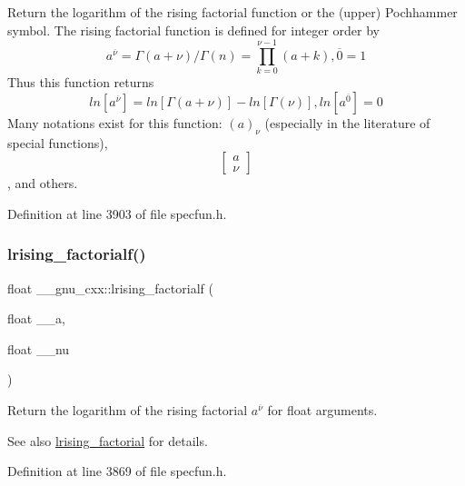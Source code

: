 Return the logarithm of the rising factorial function or the (upper) Pochhammer symbol. The rising factorial function is defined for integer order by \[ a^{\overline{\nu}} = \Gamma(a + \nu) / \Gamma(n) = \prod_{k=0}^{\nu-1} (a + k), \overline{0} = 1 \] Thus this function returns \[ ln[a^{\overline{\nu}}] = ln[\Gamma(a + \nu)] - ln[\Gamma(\nu)], ln[a^{\overline{0}}] = 0 \] Many notations exist for this function\+: $ (a)_\nu $ (especially in the literature of special functions), \[ \left[ \begin{array}{c} a \\ \nu \end{array} \right] \], and others. 



Definition at line 3903 of file specfun.\+h.

\mbox{\label{group__gnu__math__spec__func_ga68c64f4e44d03b5b3f75f90dbe2e0819}} 
\subsubsection{\texorpdfstring{lrising\+\_\+factorialf()}{lrising\_factorialf()}}
{\footnotesize\ttfamily float \+\_\+\+\_\+gnu\+\_\+cxx\+::lrising\+\_\+factorialf (\begin{DoxyParamCaption}\item[{float}]{\+\_\+\+\_\+a,  }\item[{float}]{\+\_\+\+\_\+nu }\end{DoxyParamCaption})\hspace{0.3cm}{\ttfamily [inline]}}

Return the logarithm of the rising factorial $ a^{\overline{\nu}} $ for float arguments.

\begin{DoxySeeAlso}{See also}
\hyperlink{group__gnu__math__spec__func_ga8912b75b2f7592fb61128c766e7313b9}{lrising\+\_\+factorial} for details. 
\end{DoxySeeAlso}


Definition at line 3869 of file specfun.\+h.

\mbox{\label{group__gnu__math__spec__func_ga1ac811f56f38f7ea7a1e035ec0157f6b}} 
